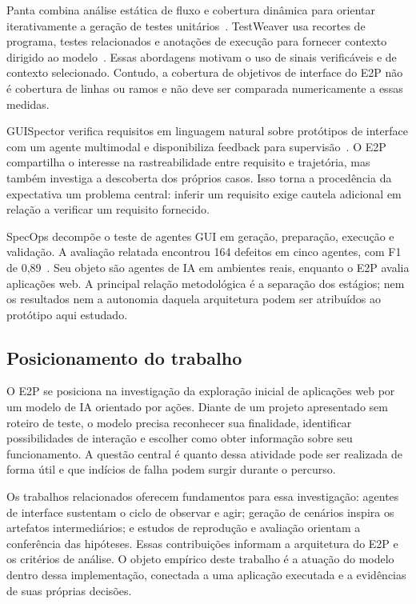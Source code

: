 \documentclass[12pt]{article}
\begin{document}
Panta combina análise estática de fluxo e cobertura dinâmica para orientar iterativamente a geração de testes unitários~\cite{gu2026panta}. TestWeaver usa recortes de programa, testes relacionados e anotações de execução para fornecer contexto dirigido ao modelo~\cite{le2026testweaver}. Essas abordagens motivam o uso de sinais verificáveis e de contexto selecionado. Contudo, a cobertura de objetivos de interface do E2P não é cobertura de linhas ou ramos e não deve ser comparada numericamente a essas medidas.

GUISpector verifica requisitos em linguagem natural sobre protótipos de interface com um agente multimodal e disponibiliza feedback para supervisão~\cite{kolthoff2025guispector}. O E2P compartilha o interesse na rastreabilidade entre requisito e trajetória, mas também investiga a descoberta dos próprios casos. Isso torna a procedência da expectativa um problema central: inferir um requisito exige cautela adicional em relação a verificar um requisito fornecido.

SpecOps decompõe o teste de agentes GUI em geração, preparação, execução e validação. A avaliação relatada encontrou 164 defeitos em cinco agentes, com F1 de 0,89~\cite{ahmed2026specops}. Seu objeto são agentes de IA em ambientes reais, enquanto o E2P avalia aplicações web. A principal relação metodológica é a separação dos estágios; nem os resultados nem a autonomia daquela arquitetura podem ser atribuídos ao protótipo aqui estudado.

\subsection{Posicionamento do trabalho}
O E2P se posiciona na investigação da exploração inicial de aplicações web por um modelo de IA orientado por ações. Diante de um projeto apresentado sem roteiro de teste, o modelo precisa reconhecer sua finalidade, identificar possibilidades de interação e escolher como obter informação sobre seu funcionamento. A questão central é quanto dessa atividade pode ser realizada de forma útil e que indícios de falha podem surgir durante o percurso.

Os trabalhos relacionados oferecem fundamentos para essa investigação: agentes de interface sustentam o ciclo de observar e agir; geração de cenários inspira os artefatos intermediários; e estudos de reprodução e avaliação orientam a conferência das hipóteses. Essas contribuições informam a arquitetura do E2P e os critérios de análise. O objeto empírico deste trabalho é a atuação do modelo dentro dessa implementação, conectada a uma aplicação executada e a evidências de suas próprias decisões.
\end{document}
